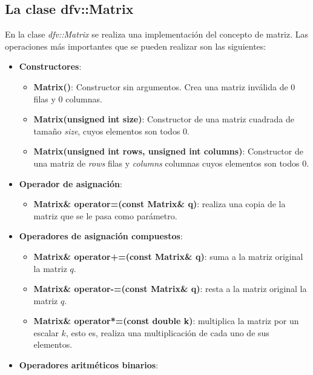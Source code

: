 \documentclass[12pt, a4paper]{report}
\begin{document}
\subsection{La clase dfv::Matrix}

En la clase \textit{dfv::Matrix} se realiza una implementación del concepto de matriz. Las operaciones más importantes que se pueden realizar son las siguientes:

\begin{itemize}

\item \textbf{Constructores}:

\begin{itemize}
\item \textbf{Matrix()}: Constructor sin argumentos. Crea una matriz inválida de 0 filas y 0 columnas.

\item \textbf{Matrix(unsigned int size)}: Constructor de una matriz cuadrada de tamaño \textit{size}, cuyos elementos son todos 0.

\item \textbf{Matrix(unsigned int rows, unsigned int columns)}: Constructor de una matriz de \textit{rows} filas y \textit{columns} columnas cuyos elementos son todos 0.
\end{itemize}

\item \textbf{Operador de asignación}:

\begin{itemize}
\item \textbf{Matrix\& operator=(const Matrix\& q)}: realiza una copia de la matriz que se le pasa como parámetro.
\end{itemize} 

\item \textbf{Operadores de asignación compuestos}:

\begin{itemize}
\item \textbf{Matrix\& operator+=(const Matrix\& q)}: suma a la matriz original la matriz $q$.
\item \textbf{Matrix\& operator-=(const Matrix\& q)}: resta a la matriz original la matriz $q$.
\item \textbf{Matrix\& operator*=(const double k)}: multiplica la matriz por un escalar $k$, esto es, realiza una multiplicación de cada uno de sus elementos.
\end{itemize}

\item \textbf{Operadores aritméticos binarios}:


\end{itemize}
\end{document}
